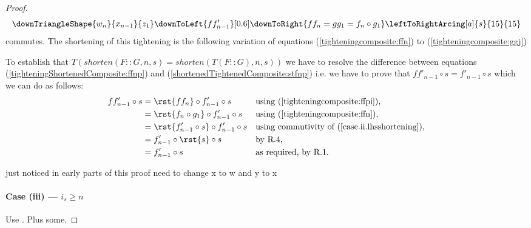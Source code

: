 \begin{proof}
\[
\downTriangleShape{w_n}{x_{n-1}}{z_1}
\downToLeft{ff'_{n-1}}[0.6]
\downToRight{ff_n=gg_1=f_n \circ g_1}
\leftToRightArcing[a]{s}{15}{15}
\]
commutes. 
The shortening of this tightening is the following variation
of equations (\ref{tighteningcomposite:ffn}) to (\ref{tighteningcomposite:ggj})

\tbd

To establish that $T(shorten(F::G,n,s)=shorten(T(F::G),n,s))$
we have to resolve the difference between equations 
(\ref{tighteningShortenedComposite:ffnp}) and
(\ref{shortenedTightenedComposite:stfnp}) i.e. we have to prove that $ff'_{n-1} \circ s
= f'_{n-1} \circ s$ which we can do as follows:
\begin{align*}
ff'_{n-1} \circ s 
   &=\rst{ff_n}\circ f'_{n-1}\circ s&&\mbox{using  (\ref{tighteningcomposite:ffpi}),}\\
   &=\rst{f_n\circ g_1}\circ f'_{n-1}\circ s&&\mbox{using (\ref{tighteningcomposite:ffn}),}\\
   &= \rst{f'_{n-1}\circ s}\circ f'_{n-1}\circ s&&\mbox{using commutivity of (\ref{case.ii.lhsshortening}),}\\
   &=f'_{n-1}\circ \rst{s} \circ s&&\mbox{by R.4,}\\
   &= f'_{n-1} \circ s     && \mbox{as required, by R.1.}
\end{align*}

\begin{aside}
just noticed in early parts of this proof need to change x to w and y to x
\end{aside}
\paragraph{Case (iii) --- $i_s \geq n$}
Use . Plus some.
\end{proof}
\newpage

